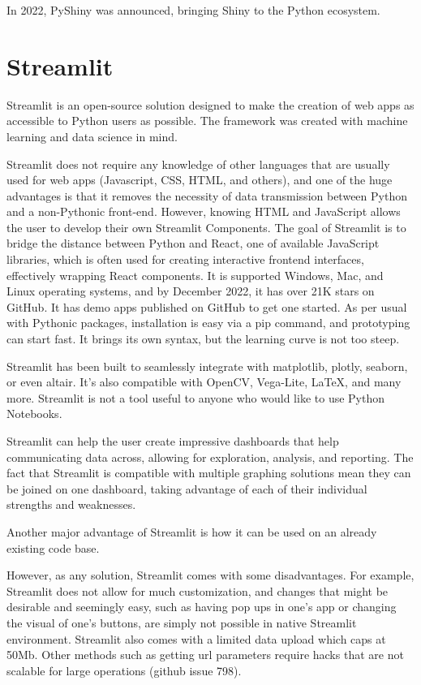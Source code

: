 In 2022, PyShiny was announced, bringing Shiny to the Python ecosystem.

\section{Streamlit}
\label{sec:streamlit}
Streamlit is an open-source solution designed to make the creation of web apps as accessible to Python users as possible. The framework was created with machine learning and data science in mind. 
 
Streamlit does not require any knowledge of other languages that are usually used for web apps (Javascript, CSS, HTML, and others), and one of the huge advantages is that it removes the necessity of data transmission between Python and a non-Pythonic front-end. However, knowing HTML and JavaScript allows the user to develop their own Streamlit Components. The goal of Streamlit is to bridge the distance between Python and React, one of available JavaScript libraries, which is often used for creating interactive frontend interfaces, effectively wrapping React components. It is supported Windows, Mac, and Linux operating systems, and by December 2022, it has over 21K stars on GitHub. It has demo apps published on GitHub to get one started. As per usual with Pythonic packages, installation is easy via a pip command, and prototyping can start fast. It brings its own syntax, but the learning curve is not too steep. 

Streamlit has been built to seamlessly integrate with matplotlib, plotly, seaborn, or even altair. It's also compatible with OpenCV, Vega-Lite, LaTeX, and many more. Streamlit is not a tool useful to anyone who would like to use Python Notebooks.

Streamlit can help the user create impressive dashboards that help communicating data across, allowing for exploration, analysis, and reporting. The fact that Streamlit is compatible with multiple graphing solutions mean they can be joined on one dashboard, taking advantage of each of their individual strengths and weaknesses. 

Another major advantage of Streamlit is how it can be used on an already existing code base.

However, as any solution, Streamlit comes with some disadvantages. For example, Streamlit does not allow for much customization, and changes that might be desirable and seemingly easy, such as having pop ups in one's app or changing the visual of one's buttons, are simply not possible in native Streamlit environment. Streamlit also comes with a limited data upload which caps at 50Mb. Other methods such as getting url parameters require hacks that are not scalable for large operations (github issue 798). 

